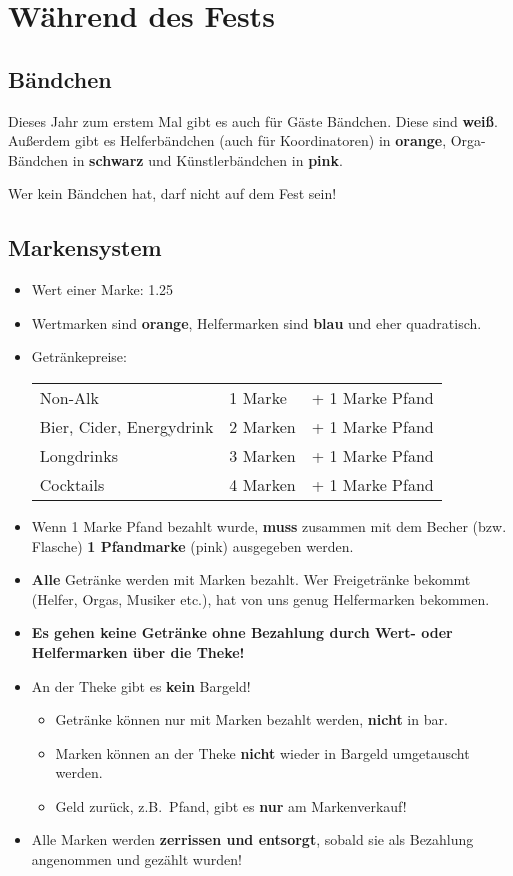 \section{Während des Fests}
\subsection{Bändchen}
Dieses Jahr zum erstem Mal gibt es auch für Gäste Bändchen. Diese sind \textbf{weiß}. Außerdem gibt es Helferbändchen (auch für Koordinatoren) in \textbf{orange}, Orga-Bändchen in \textbf{schwarz} und Künstlerbändchen in \textbf{pink}.

Wer kein Bändchen hat, darf nicht auf dem Fest sein!
\subsection{Markensystem}
\begin{itemize}
    \item Wert einer Marke: {\large\SI{1.25}{\EUR}}
    \item Wertmarken sind \textbf{orange}, Helfermarken sind \textbf{blau} und eher quadratisch.
    \item Getränkepreise:

        \begin{tabular}{lll}
            Non-Alk & 1 Marke & + 1 Marke Pfand \\
            Bier, Cider, Energydrink & 2 Marken & + 1 Marke Pfand \\
            Longdrinks & 3 Marken & + 1 Marke Pfand \\
            Cocktails & 4 Marken & + 1 Marke Pfand
        \end{tabular}
    \item Wenn 1 Marke Pfand bezahlt wurde, \textbf{muss} zusammen mit dem Becher (bzw. Flasche) \textbf{1 Pfandmarke} (pink) ausgegeben werden.
    \item \textbf{Alle} Getränke werden mit Marken bezahlt. Wer Freigetränke bekommt (Helfer, Orgas, Musiker etc.), hat von uns genug Helfermarken bekommen.
    \item \textbf{Es gehen keine Getränke ohne Bezahlung durch Wert- oder Helfermarken über die Theke!}
    \item An der Theke gibt es \textbf{kein} Bargeld!
        \begin{itemize}
            \item Getränke können nur mit Marken bezahlt werden, \textbf{nicht} in bar.
            \item Marken können an der Theke \textbf{nicht} wieder in Bargeld umgetauscht werden.
            \item Geld zurück, z.B.\ Pfand, gibt es \textbf{nur} am Markenverkauf!
        \end{itemize}
    \item Alle Marken werden \textbf{zerrissen und entsorgt}, sobald sie als Bezahlung angenommen und gezählt wurden!
\end{itemize}
